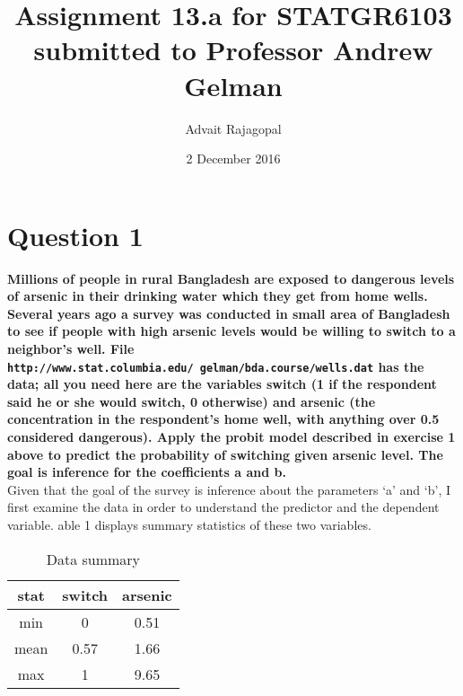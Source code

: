 \documentclass{article}
\title{Assignment 13.a for \textbf{STATGR6103}\\
\large submitted to Professor Andrew Gelman}
\date{2 December 2016}
\author{Advait Rajagopal}
\begin{document}
  \maketitle
  \section{Question 1}
\textbf{Millions of people in rural Bangladesh are exposed to dangerous levels of arsenic in their drinking water which they get from home wells. Several years ago a survey was conducted in small area of Bangladesh to see if people with high arsenic levels would be willing to switch to a neighbor's well. File \texttt{http://www.stat.columbia.edu/~gelman/bda.course/wells.dat} has the data; all you need here are the variables switch (1 if the respondent said he or she would switch, 0 otherwise) and arsenic (the concentration in the respondent's home well, with anything over 0.5 considered dangerous). Apply the probit model described in exercise 1 above to predict the probability of switching given arsenic level. The goal is inference for the coefficients a and b.}\\

Given that the goal of the survey is inference about the parameters `a' and `b', I first examine the data in order to understand the predictor and the dependent variable. 
able 1 displays summary statistics of these two variables.
\begin{table} [H]
\caption {Data summary}
\vspace{2mm}
\def\arraystretch{1}
\centering \begin{tabular}{c c c} 
\hline\hline 
\vspace{1mm}
stat & switch  & arsenic \\ \hline
 min & 0&  0.51 \\
 mean &  0.57 & 1.66\\
 max & 1 & 9.65\\
\hline 
\end{tabular}
\end{table}
\end{document}

